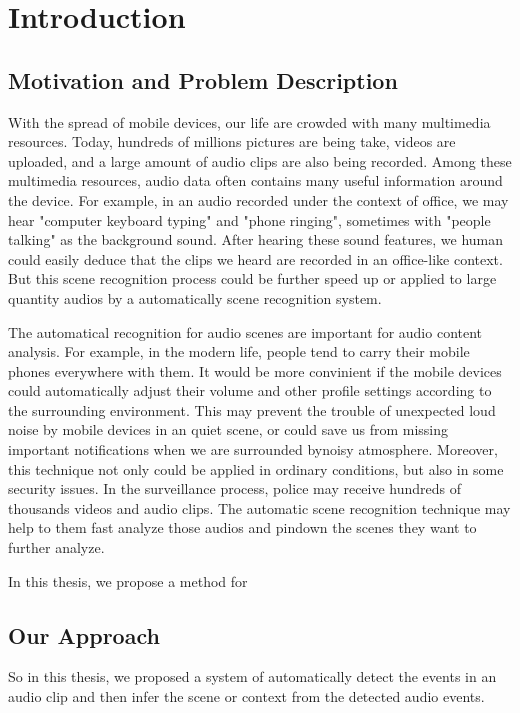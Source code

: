 
\chapter{Introduction}

\section{Motivation and Problem Description}
With the spread of mobile devices, our life are crowded with many multimedia resources. 
Today, hundreds of millions pictures are being take, videos are uploaded, and a large amount of audio clips are also being recorded. 
Among these multimedia resources, audio data often contains many useful information around the device. 
For example, in an audio recorded under the context of office, we may hear "computer keyboard typing" and "phone ringing", sometimes with "people talking" as the background sound. 
After hearing these sound features, we human could easily deduce that the clips we heard are recorded in an office-like context. 
But this scene recognition process could be further speed up or applied to large quantity audios by a automatically scene recognition system.  

The automatical recognition for audio scenes are important for audio content analysis. 
For example, in the modern life, people tend to carry their mobile phones everywhere with them. 
It would be more convinient if the mobile devices could automatically adjust their volume and other profile settings according to the surrounding environment. 
This may prevent the trouble of unexpected loud noise by mobile devices in an quiet scene, or could save us from missing important notifications when we are surrounded bynoisy atmosphere.  
Moreover, this technique not only could be applied in ordinary conditions, but also in some security issues. 
In the surveillance process, police may receive hundreds of thousands videos and audio clips. 
The automatic scene recognition technique may help to them fast analyze those audios and pindown the scenes they want to further analyze. 

In this thesis, we propose a method for  
\section{Our Approach}
So in this thesis, we proposed a system of automatically detect the events in an audio clip and then infer the scene or context from the detected audio events. 

